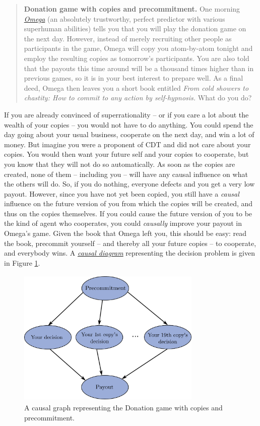 \begin{quote}
\textbf{Donation game with copies and precommitment.} One morning
\href{https://wiki.lesswrong.com/wiki/Omega}{\emph{Omega}} (an
absolutely trustworthy, perfect predictor with various superhuman
abilities) tells you that you will play the donation game on the next
day. However, instead of merely recruiting other people as participants
in the game, Omega will copy you atom-by-atom tonight and employ the
resulting copies as tomorrow's participants. You are also told that the
payouts this time around will be a thousand times higher than in
previous games, so it is in your best interest to prepare well. As a
final deed, Omega then leaves you a short book entitled \emph{From cold
showers to chastity: How to commit to any action by self-hypnosis.} What
do you do?
\end{quote}

If you are already convinced of superrationality -- or if you care a lot
about the wealth of your copies -- you would not have to do anything.
You could spend the day going about your usual business, cooperate on
the next day, and win a lot of money. But imagine you were a proponent
of CDT and did not care about your copies. You would then want your
future self and your copies to cooperate, but you know that they will
not do so automatically. As soon as the copies are created, none of them
-- including you -- will have any causal influence on what the others
will do. So, if you do nothing, everyone defects and you get a very low
payout. However, since you have not yet been copied, you still have a
\emph{causal} influence on the future version of you from which the
copies will be created, and thus on the copies themselves. If you could
cause the future version of you to be the kind of agent who cooperates,
you could \emph{causally} improve your payout in Omega's game. Given the
book that Omega left you, this should be easy: read the book, precommit
yourself -- and thereby all your future copies -- to cooperate, and
everybody wins. A
\href{https://en.wikipedia.org/wiki/Causal_model\#Causal_diagram}{\emph{causal
diagram}} representing the decision problem is given in Figure
\ref{precommitment-causal-graph}.

\begin{figure}[t!]
    \centering
    \includegraphics[width=3.46217in,height=2.59375in]{figs/precommitment-causal-graph}
    \caption{A causal graph representing the Donation game with copies and precommitment.}
    \label{precommitment-causal-graph}
\end{figure}


